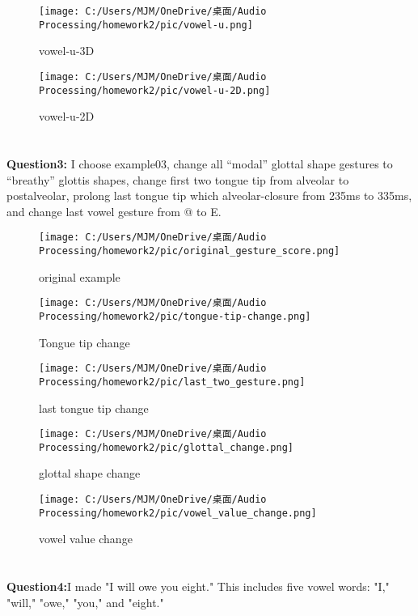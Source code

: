 \documentclass[10pt]{article}
\begin{document}
		\begin{figure}[htbp]
		\begin{minipage}[t]{0.45\linewidth}
			\centering
			\texttt{[image: C:/Users/MJM/OneDrive/桌面/Audio Processing/homework2/pic/vowel-u.png]}
			\caption{vowel-u-3D}
		\end{minipage}%
		\begin{minipage}[t]{0.45\linewidth}
			\centering
			\texttt{[image: C:/Users/MJM/OneDrive/桌面/Audio Processing/homework2/pic/vowel-u-2D.png]}
			\caption{vowel-u-2D}
		\end{minipage}
	\end{figure}
	\newpage
	\section*{}
	\textbf{Question3:} I choose example03, change all “modal” glottal shape gestures to “breathy” glottis shapes, change first two tongue tip from alveolar to postalveolar, prolong last tongue tip which alveolar-closure from 235ms to 335ms, and change last vowel gesture from @ to E.
	\begin{figure}[h!]
		\centering
		\texttt{[image: C:/Users/MJM/OneDrive/桌面/Audio Processing/homework2/pic/original\_gesture\_score.png]}
		\caption{original example}
		\label{fig:original}
	\end{figure}
	\begin{figure}[h!]
		\centering
		\texttt{[image: C:/Users/MJM/OneDrive/桌面/Audio Processing/homework2/pic/tongue-tip-change.png]}
		\caption{Tongue tip change}
		\label{fig:tongue tip change}
	\end{figure}
	\begin{figure}[h!]
		\centering
		\texttt{[image: C:/Users/MJM/OneDrive/桌面/Audio Processing/homework2/pic/last\_two\_gesture.png]}
		\caption{last tongue tip change}
		\label{fig:last two}
	\end{figure}
	\begin{figure}[h!]
		\centering
		\texttt{[image: C:/Users/MJM/OneDrive/桌面/Audio Processing/homework2/pic/glottal\_change.png]}
		\caption{glottal shape change}
		\label{fig:glottal shape change}
	\end{figure}
		\begin{figure}[h!]
		\centering
		\texttt{[image: C:/Users/MJM/OneDrive/桌面/Audio Processing/homework2/pic/vowel\_value\_change.png]}
		\caption{vowel value change}
		\label{fig:vowel value change}
	\end{figure}
	\section*{}
	\textbf{Question4:}I made "I will owe you eight."
	This includes five vowel words: "I," "will," "owe," "you," and "eight."
	
\end{document}
